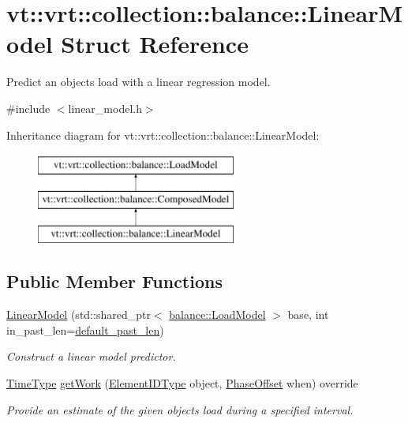 \hypertarget{structvt_1_1vrt_1_1collection_1_1balance_1_1_linear_model}{}\section{vt\+:\+:vrt\+:\+:collection\+:\+:balance\+:\+:Linear\+Model Struct Reference}
\label{structvt_1_1vrt_1_1collection_1_1balance_1_1_linear_model}


Predict an object\textquotesingle{}s load with a linear regression model.  




{\ttfamily \#include $<$linear\+\_\+model.\+h$>$}

Inheritance diagram for vt\+:\+:vrt\+:\+:collection\+:\+:balance\+:\+:Linear\+Model\+:\begin{figure}[H]
\begin{center}
\leavevmode
\includegraphics[height=3.000000cm]{structvt_1_1vrt_1_1collection_1_1balance_1_1_linear_model}
\end{center}
\end{figure}
\subsection*{Public Member Functions}
\begin{DoxyCompactItemize}
\item 
\hyperlink{structvt_1_1vrt_1_1collection_1_1balance_1_1_linear_model_a5635a178ad9efde93b96d5f44e849175}{Linear\+Model} (std\+::shared\+\_\+ptr$<$ \hyperlink{classvt_1_1vrt_1_1collection_1_1balance_1_1_load_model}{balance\+::\+Load\+Model} $>$ base, int in\+\_\+past\+\_\+len=\hyperlink{structvt_1_1vrt_1_1collection_1_1balance_1_1_linear_model_a17d295e933227905ba94ea69f1cbfb64}{default\+\_\+past\+\_\+len})
\begin{DoxyCompactList}\small\item\em Construct a linear model predictor. \end{DoxyCompactList}\item 
\hyperlink{namespacevt_a876a9d0cd5a952859c72de8a46881442}{Time\+Type} \hyperlink{structvt_1_1vrt_1_1collection_1_1balance_1_1_linear_model_a21150f198d266175ea015c0caebad5b5}{get\+Work} (\hyperlink{namespacevt_1_1vrt_1_1collection_1_1balance_a14c8d2c972f2913aa3f1636e5be0a120}{Element\+I\+D\+Type} object, \hyperlink{structvt_1_1vrt_1_1collection_1_1balance_1_1_phase_offset}{Phase\+Offset} when) override
\begin{DoxyCompactList}\small\item\em Provide an estimate of the given object\textquotesingle{}s load during a specified interval. \end{DoxyCompactList}\end{DoxyCompactItemize}
